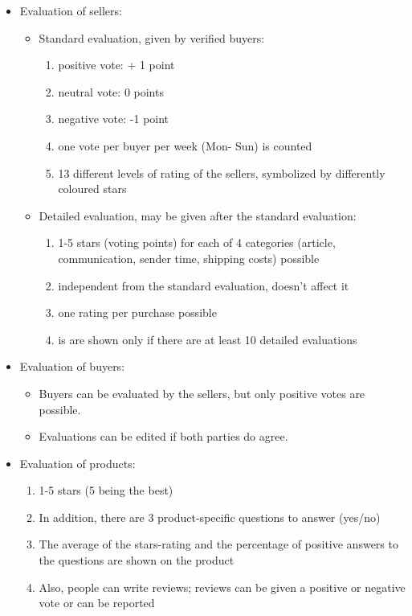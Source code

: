\begin{itemize}
   \item Evaluation of sellers:
   \begin{itemize}
		\item Standard evaluation, given by verified buyers:
   			\begin{enumerate}
			\item positive vote: + 1 point
			\item neutral vote: 0 points
			\item negative vote: -1 point
			\item one vote per buyer per week (Mon- Sun) is counted 
			\item 13 different levels of rating of the sellers, symbolized by differently coloured stars
  			\end{enumerate}
		\item Detailed evaluation, may be given after the standard evaluation: 
   			\begin{enumerate}
			\item 1-5 stars (voting points) for each of 4 categories (article, communication, sender time, shipping costs) possible
			\item independent from the standard evaluation, doesn't affect it
			\item one rating per purchase possible
			\item is are shown only if there are at least 10 detailed evaluations
  			\end{enumerate}
   \end{itemize}
   \item Evaluation of buyers:
   \begin{itemize}
		\item Buyers can be evaluated by the sellers, but only positive votes are possible.
		\item Evaluations can be edited if both parties do agree.
   \end{itemize}
   \item Evaluation of products: 
   			\begin{enumerate}
				\item 1-5 stars (5 being the best) 
				\item In addition, there are 3 product-specific questions to answer (yes/no) 
				\item The average of the stars-rating and the percentage of positive answers to the questions are shown on the product
				\item Also, people can write reviews; reviews can be given a positive or negative vote or can be reported
  			\end{enumerate}
\end{itemize}




